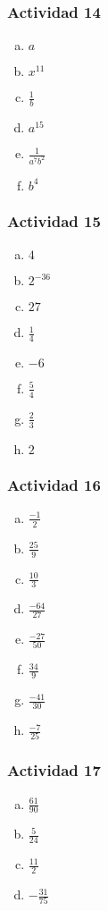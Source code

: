 \documentclass[a4paper, twocolumn]{article}
\begin{document}
\subsubsection*{Actividad 14}
\begin{enumerate}[a)]
\item $a$
\item $x^{11}$
\item $\frac{1}{b}$
\item $a^{15}$
\item $\frac{1}{a^7b^2}$
\item $b^4$

\end{enumerate}

\subsubsection*{Actividad 15}
\begin{enumerate}[a)]
\item $4$
\item ${2^{-36}}$
\item $27$
\item $\frac{1}{4}$
\item $-6$
\item $\frac{5}{4}$
\item $\frac{2}{3}$
\item $2$
\end{enumerate}

\subsubsection*{Actividad 16}
\begin{enumerate}[a)]
\item $\frac{-1}{2}$
\item $\frac{25}{9}$
\item $\frac{10}{3}$
\item $\frac{-64}{27}$
\item $\frac{-27}{50}$
\item $\frac{34}{9}$
\item $\frac{-41}{30}$
\item $\frac{-7}{25}$
\end{enumerate}

\subsubsection*{Actividad 17}
\begin{enumerate}[a)]
\item $\frac{61}{90}$
\item $\frac{5}{24}$
\item $\frac{11}{2}$
\item $-\frac{31}{75}$
\end{enumerate}
\end{document}

